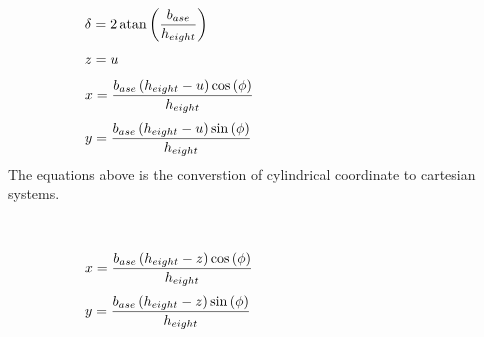 \documentclass[10pt,a4paper,leqno]{article}
\begin{document}
\begin{CJK*}{UTF8}{gbsn}
\begin{equation}
 \begin{minipage}{250pt}
                \begin{flushleft} $\displaystyle \delta = 2 \operatorname{atan}{\left(\frac{b_{ase}}{h_{eight}} \right)}$  \end{flushleft}
 \end{minipage}
 \end{equation}
\begin{equation}
 \begin{minipage}{250pt}
                \begin{flushleft} $\displaystyle z = u$  \end{flushleft}
 \end{minipage}
 \end{equation}
\begin{equation}
 \begin{minipage}{250pt}
                \begin{flushleft} $\displaystyle x = \frac{b_{ase} \left(h_{eight} - u\right) \cos{\left(\phi \right)}}{h_{eight}}$  \end{flushleft}
 \end{minipage}
 \end{equation}
\begin{equation}
 \begin{minipage}{250pt}
                \begin{flushleft} $\displaystyle y = \frac{b_{ase} \left(h_{eight} - u\right) \sin{\left(\phi \right)}}{h_{eight}}$  \end{flushleft}
 \end{minipage}
 \end{equation}
\noindent The equations above is the converstion of cylindrical coordinate to cartesian systems.
 \par \ \par\begin{equation}
 \begin{minipage}{250pt}
                \begin{flushleft} $\displaystyle x = \frac{b_{ase} \left(h_{eight} - z\right) \cos{\left(\phi \right)}}{h_{eight}}$  \end{flushleft}
 \end{minipage}
 \end{equation}
\begin{equation}
 \begin{minipage}{250pt}
                \begin{flushleft} $\displaystyle y = \frac{b_{ase} \left(h_{eight} - z\right) \sin{\left(\phi \right)}}{h_{eight}}$  \end{flushleft}

\end{minipage}
\end{equation}
\end{CJK*}
\end{document}
